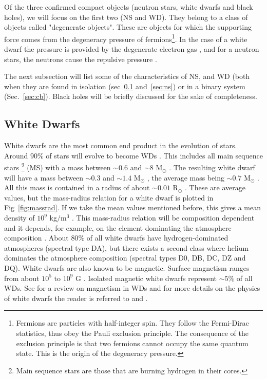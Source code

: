 Of the three confirmed compact objects (neutron stars, white dwarfs and black holes), we will focus on the first two (NS and WD). They belong to a class of objects called "degenerate objects". These are objects for which the supporting force comes from the degeneracy pressure of fermions\footnote{Fermions are particles with half-integer spin. They follow the Fermi-Dirac statistics, thus obey the Pauli exclusion principle. The consequence of the exclusion principle is that two fermions cannot occupy the same quantum state. This is the origin of the degeneracy pressure. }. In the case of a white dwarf the pressure is provided by the degenerate electron gas \citep{fowler_dense_1926}, and for a neutron stars, the neutrons cause the repulsive pressure \citep{1939PhRv...55..374O}. 

The next subsection will list some of the characteristics of NS, and WD (both when they are found in isolation (sec~\ref{sec:wd} and~\ref{sec:ns}) or in a binary system (Sec.~\ref{sec:cb}). Black holes will be briefly discussed for the sake of completeness. 


\subsection[White Dwarfs]{White Dwarfs}\label{sec:wd} 

White dwarfs are the most common end product in the evolution of stars. Around $90 \%$ of stars will evolve to become WDs \citep{koester_white_1980}. This includes all main sequence stars \footnote{Main sequence stars are those that are burning hydrogen in their cores.} (MS) with a mass between $\sim 0.6$ and  $\sim 8$ M$_\odot$ \citep{koester_physics_1990}. The resulting white dwarf will have a mass between $\sim 0.3$ and $\sim 1.4$ M$_\odot$ \citep{prada_moroni_very_2009,chandrasekhar_maximum_1931}, the average mass being $\sim 0.7$ M$_\odot$ \citep{koester_physics_1990}. All this mass is contained in a radius of about $\sim 0.01$ R$_\odot$ \citep{kepler_structure_1995}. These are average values, but the mass-radius relation for a white dwarf is plotted in Fig~\ref{fig:massrad}. If we take the mean values mentioned before, this gives a mean density of $10^9$ kg$/$m$^3$ . This mass-radius relation will be composition dependent and it depends, for example, on the element dominating the atmosphere composition \citep{hamada_models_1961}. About $80 \%$ of all white dwarfs have hydrogen-dominated atmospheres (spectral type DA), but there exists a second class where helium dominates the atmosphere composition (spectral types D0, DB, DC, DZ and DQ)\citep{wickramasinghe_magnetism_2000,koester_physics_1990}. White dwarfs are also known to be magnetic. Surface magnetism ranges from about $10^5$ to $10^9$ G \citep{suh_mass-radius_2000}. Isolated magnetic white dwarfs represent $\sim 5 \%$ of all WDs. See \cite{wickramasinghe_magnetism_2000} for a review on magnetism in WDs and for more details on the physics of white dwarfs the reader is referred to \cite{koester_physics_1990} and \cite{kepler_structure_1995}.


